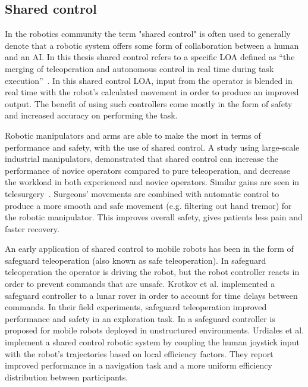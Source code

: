 \documentclass[a4paper,12pt,oneside,openright]{bhamthesis}
\begin{document}

\subsection{Shared control}
In the robotics community the term "shared control" is often used to generally denote that a robotic system offers some form of collaboration between a human and an AI. In this thesis shared control refers to a specific LOA defined as ``the merging of teleoperation and autonomous control in real time during task execution''~\cite{Backes1994}. In this shared control LOA, input from the operator is blended in real time with the robot's calculated movement in order to produce an improved output. The benefit of using such controllers come mostly in the form of safety and increased accuracy on performing the task. 

Robotic manipulators and arms are able to make the most in terms of performance and safety, with the use of shared control. A study using large-scale industrial manipulators, \cite{Hansson2010} demonstrated that shared control can increase the performance of novice operators compared to pure teleoperation, and decrease the workload in both experienced and novice operators. Similar gains are seen in telesurgery~\cite{Ballantyne2002}. Surgeons' movements are combined with automatic control to produce a more smooth and safe movement (e.g. filtering out hand tremor) for the robotic manipulator. This improves overall safety, gives patients less pain and faster recovery.

An early application of shared control to mobile robots has been in the form of safeguard teleoperation (also known as safe teleoperation). In safeguard teleoperation the operator is driving the robot, but the robot controller reacts in order to prevent commands that are unsafe. Krotkov et al. \cite{Krotkov1996} implemented a safeguard controller to a lunar rover in order to account for time delays between commands. In their field experiments, safeguard teleoperation improved performance and safety in an exploration task. In \cite{Fong2001a} a safeguard controller is proposed for mobile robots deployed in unstructured environments. Urdiales et al. \cite{Urdiales2007} implement a shared control robotic system by coupling the human joystick input with the robot's trajectories based on local efficiency factors. They report improved performance in a navigation task and a more uniform efficiency distribution between participants.
\end{document}
